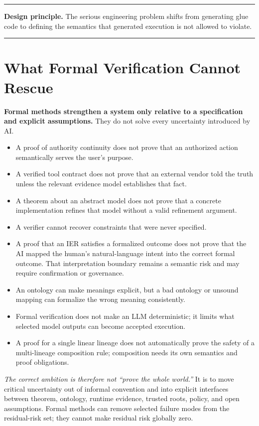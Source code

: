\documentclass[10pt,oneside,openany]{book}
\newcommand{\principle}[1]{%
  \vspace{4pt}
  \noindent\begin{minipage}{\linewidth}
  \hrule\vspace{5pt}
  \small\sffamily\raggedright\textbf{Design principle.} #1
  \vspace{5pt}\hrule
  \end{minipage}\vspace{4pt}
}
\begin{document}
\principle{The serious engineering problem shifts from generating glue code to defining the semantics that generated execution is not allowed to violate.}

\chapter{What Formal Verification Cannot Rescue}

\textbf{Formal methods strengthen a system only relative to a specification and explicit assumptions.} They do not solve every uncertainty introduced by AI.

\begin{itemize}
\item A proof of authority continuity does not prove that an authorized action semantically serves the user's purpose.
\item A verified tool contract does not prove that an external vendor told the truth unless the relevant evidence model establishes that fact.
\item A theorem about an abstract model does not prove that a concrete implementation refines that model without a valid refinement argument.
\item A verifier cannot recover constraints that were never specified.
\item A proof that an IER satisfies a formalized outcome does not prove that the AI mapped the human's natural-language intent into the correct formal outcome. That interpretation boundary remains a semantic risk and may require confirmation or governance.
\item An ontology can make meanings explicit, but a bad ontology or unsound mapping can formalize the wrong meaning consistently.
\item Formal verification does not make an LLM deterministic; it limits what selected model outputs can become accepted execution.
\item A proof for a single linear lineage does not automatically prove the safety of a multi-lineage composition rule; composition needs its own semantics and proof obligations.
\end{itemize}

\emph{The correct ambition is therefore not ``prove the whole world.''} It is to move critical uncertainty out of informal convention and into explicit interfaces between theorem, ontology, runtime evidence, trusted roots, policy, and open assumptions. Formal methods can remove selected failure modes from the residual-risk set; they cannot make residual risk globally zero.
\end{document}
